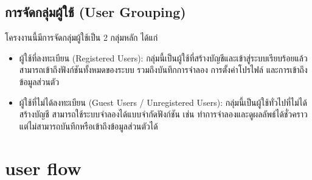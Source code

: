 \subsection{การจัดกลุ่มผู้ใช้ (User Grouping)}
\indent โครงงานนี้มีการจัดกลุ่มผู้ใช้เป็น 2 กลุ่มหลัก ได้แก่
\begin{itemize}
    \item ผู้ใช้ที่ลงทะเบียน (Registered Users): กลุ่มนี้เป็นผู้ใช้ที่สร้างบัญชีและเข้าสู่ระบบเรียบร้อยแล้ว 
    สามารถเข้าถึงฟังก์ชันทั้งหมดของระบบ รวมถึงบันทึกการจำลอง การตั้งค่าโปรไฟล์ และการเข้าถึงข้อมูลส่วนตัว
    \item ผู้ใช้ที่ไม่ได้ลงทะเบียน (Guest Users / Unregistered Users): กลุ่มนี้เป็นผู้ใช้ทั่วไปที่ไม่ได้สร้างบัญชี 
    สามารถใช้ระบบจำลองได้แบบจำกัดฟังก์ชัน เช่น ทำการจำลองและดูผลลัพธ์ได้ชั่วคราว 
    แต่ไม่สามารถบันทึกหรือเข้าถึงข้อมูลส่วนตัวได้
\end{itemize}

\section{user flow}

